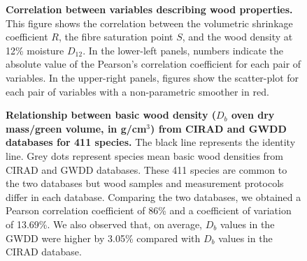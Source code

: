 \documentclass[a4paper, 12pt, leqno, dvipsnames]{article}\usepackage[]{graphicx}\usepackage[]{color}
\begin{document}
\begin{figure}[!h] 
\caption{\textbf{Correlation between variables describing wood properties.} This figure shows the correlation between the volumetric shrinkage coefficient $R$, the fibre saturation point $S$, and the wood density at 12\% moisture $D_{12}$. In the lower-left panels, numbers indicate the absolute value of the Pearson's correlation coefficient for each pair of variables. In the upper-right panels, figures show the scatter-plot for each pair of variables with a non-parametric smoother in red.}\label{fig:Correlations}
\end{figure}

\begin{figure}[!h] 
\caption{\textbf{Relationship between basic wood density ($D_b$ oven dry mass/green volume, in g/cm$^3$) from CIRAD and GWDD databases for 411 species.} The black line represents the identity line. Grey dots represent species mean basic wood densities from CIRAD and GWDD databases. These 411 species are common to the two databases but wood samples and measurement protocols differ in each database. Comparing the two databases, we obtained a Pearson correlation coefficient of 86\% and a coefficient of variation of 13.69\%. We also observed that, on average, $D_b$ values in the GWDD were higher by 3.05\% compared with $D_b$ values in the CIRAD database.}\label{fig:CIRAD-GWDD-Db}
\end{figure}
\end{document}
